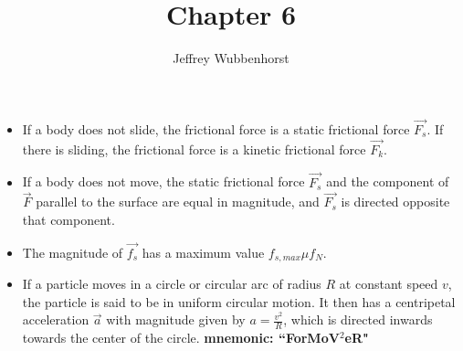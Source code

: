 \documentclass[10pt,letterpaper]{article}
\author{Jeffrey Wubbenhorst}
\title{Chapter 6}
\begin{document}
\maketitle


\begin{itemize}
\item If a body does not slide, the frictional force is a static frictional force $\vec{F_s}$. If there is sliding, the frictional force is a kinetic frictional force $\vec{F_k}$. 
\item If a body does not move, the static frictional force $\vec{F_s}$ and the component of $\vec{F}$ parallel to the surface are equal in magnitude, and $\vec{F_s}$ is directed opposite that component. 
\item The magnitude of $\vec{f_s}$ has a maximum value $f_{s,max}\mu f_N$. 
\item If a particle moves in a circle or circular arc of radius $R$ at constant speed $v$, the particle is said to be in uniform circular motion. It then has a centripetal acceleration $\vec{a}$ with magnitude given by $a=\frac{v^2}{R}$, which is directed inwards towards the center of the circle. \textbf{mnemonic: ``ForMoV$^2$eR"}


\end{itemize}
\end{document}
